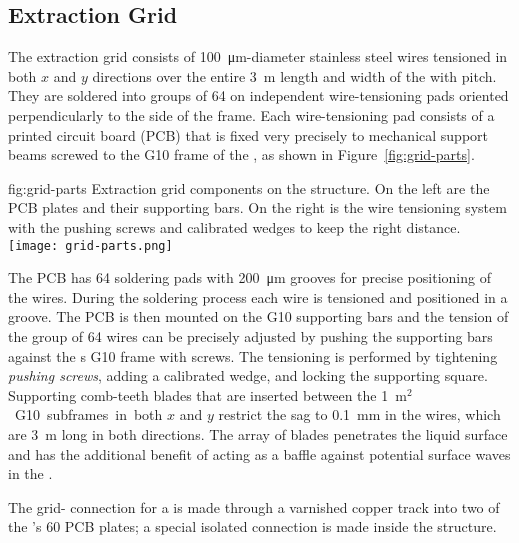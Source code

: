 \subsection{Extraction Grid}
\label{sec:fddp-crp-grid}
The extraction grid consists of \SI{100}{\micro\meter}-diameter stainless steel wires tensioned in both $x$ and $y$ directions over the entire \SI{3}{m} length and width of the  with \dpstrippitch pitch. They are soldered into groups of \num{64} on independent wire-tensioning pads oriented perpendicularly to the side of the  frame. Each wire-tensioning pad consists of a printed circuit board (PCB)  that is fixed very precisely to mechanical support beams screwed to the G10 frame of the , as shown in Figure~\ref{fig:grid-parts}.
 
\begin{dunefigure}{fig:grid-parts}
{Extraction grid components on the  structure. On the left are the PCB plates and their supporting bars. On the right is the %
wire tensioning system with the pushing screws and calibrated wedges to keep the right distance.}
\texttt{[image: grid-parts.png]}
\end{dunefigure}

The PCB has \num{64} soldering pads with \SI{200}{\micro\meter} grooves for precise positioning of the wires. During the %
soldering process each wire is tensioned and positioned in a groove. The PCB is then mounted on the G10 supporting bars and the tension of the group of \num{64} wires can be precisely adjusted by pushing the supporting bars against the s G10 frame with screws. The tensioning is performed by tightening \textit{pushing screws}, adding a calibrated wedge, and locking the supporting square.
Supporting comb-teeth blades that are inserted between the \SI{1}{m$^2$} G10 subframes in both $x$ and $y$ restrict the sag to \SI{0.1}{mm} in the wires, which are \SI{3}{m} long in both directions. The array of blades penetrates the liquid surface and has the additional benefit of acting as a baffle against potential surface waves in the \lar.

The grid- connection for a  is made through a varnished copper track into two of the 's \num{60} PCB plates; a special isolated connection %
is made inside the  structure.

